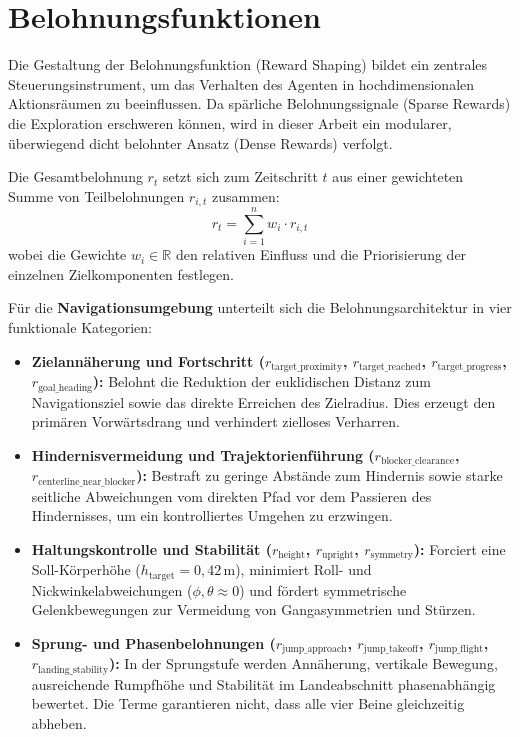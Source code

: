 \section{Belohnungsfunktionen} \label{reward_functions}

Die Gestaltung der Belohnungsfunktion (Reward Shaping) bildet ein zentrales Steuerungsinstrument, um das Verhalten des Agenten in hochdimensionalen Aktionsräumen zu beeinflussen. Da spärliche Belohnungssignale (Sparse Rewards) die Exploration erschweren können, wird in dieser Arbeit ein modularer, überwiegend dicht belohnter Ansatz (Dense Rewards) verfolgt.

Die Gesamtbelohnung $r_t$ setzt sich zum Zeitschritt $t$ aus einer gewichteten Summe von Teilbelohnungen $r_{i,t}$ zusammen:
\begin{equation}
r_t = \sum_{i=1}^{n} w_i \cdot r_{i,t}
\end{equation}
wobei die Gewichte $w_i \in \mathbb{R}$ den relativen Einfluss und die Priorisierung der einzelnen Zielkomponenten festlegen.

Für die \textbf{Navigationsumgebung} unterteilt sich die Belohnungsarchitektur in vier funktionale Kategorien:
\begin{itemize}
	\item \textbf{Zielannäherung und Fortschritt ($r_{\text{target\_proximity}}$, $r_{\text{target\_reached}}$, $r_{\text{target\_progress}}$, $r_{\text{goal\_heading}}$):} Belohnt die Reduktion der euklidischen Distanz zum Navigationsziel sowie das direkte Erreichen des Zielradius. Dies erzeugt den primären Vorwärtsdrang und verhindert zielloses Verharren.
	\item \textbf{Hindernisvermeidung und Trajektorienführung ($r_{\text{blocker\_clearance}}$, $r_{\text{centerline\_near\_blocker}}$):} Bestraft zu geringe Abstände zum Hindernis sowie starke seitliche Abweichungen vom direkten Pfad vor dem Passieren des Hindernisses, um ein kontrolliertes Umgehen zu erzwingen.
	\item \textbf{Haltungskontrolle und Stabilität ($r_{\text{height}}$, $r_{\text{upright}}$, $r_{\text{symmetry}}$):} Forciert eine Soll-Körperhöhe ($h_{\text{target}} = 0{,}42\,\text{m}$), minimiert Roll- und Nickwinkelabweichungen ($\phi, \theta \approx 0$) und fördert symmetrische Gelenkbewegungen zur Vermeidung von Gangasymmetrien und Stürzen.
	\item \textbf{Sprung- und Phasenbelohnungen ($r_{\text{jump\_approach}}$, $r_{\text{jump\_takeoff}}$, $r_{\text{jump\_flight}}$, $r_{\text{landing\_stability}}$):} In der Sprungstufe werden Annäherung, vertikale Bewegung, ausreichende Rumpfhöhe und Stabilität im Landeabschnitt phasenabhängig bewertet. Die Terme garantieren nicht, dass alle vier Beine gleichzeitig abheben.
\end{itemize}


